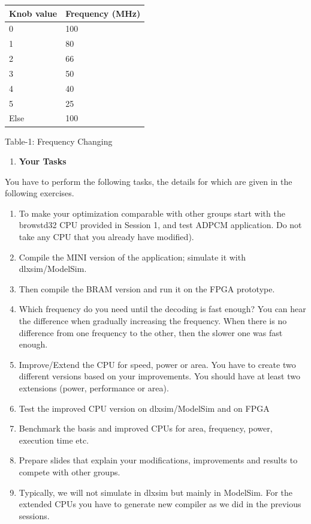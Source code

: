 \documentclass[
]{article}
\begin{document}
\begin{longtable}[]{@{}ll@{}}
\toprule
Knob value & Frequency (MHz)\tabularnewline
\midrule
\endhead
0 & 100\tabularnewline
1 & 80\tabularnewline
2 & 66\tabularnewline
3 & 50\tabularnewline
4 & 40\tabularnewline
5 & 25\tabularnewline
Else & 100\tabularnewline
\bottomrule
\end{longtable}

Table-1: Frequency Changing

\begin{enumerate}
\def\labelenumi{\arabic{enumi}.}
\setcounter{enumi}{1}
\item
  \textbf{Your Tasks}
\end{enumerate}

You have to perform the following tasks, the details for which are given
in the following exercises.

\begin{enumerate}
\def\labelenumi{\arabic{enumi}.}
\item
  To make your optimization comparable with other groups start with the
  browstd32 CPU provided in Session 1, and test ADPCM application. {Do
  not take any CPU that you already have modified}).
\item
  Compile the MINI version of the application; simulate it with
  dlxsim/ModelSim.
\item
  Then compile the BRAM version and run it on the FPGA prototype.
\item
  Which frequency do you need until the decoding is fast enough? You can
  hear the difference when gradually increasing the frequency. When
  there is no difference from one frequency to the other, then the
  slower one was fast enough.
\item
  Improve/Extend the CPU for speed, power or area. You have to create
  two different versions based on your improvements. You should have at
  least two extensions (power, performance or area).
\item
  Test the improved CPU version on dlxsim/ModelSim and on FPGA
\item
  Benchmark the basis and improved CPUs for area, frequency, power,
  execution time etc.
\item
  Prepare slides that explain your modifications, improvements and
  results to compete with other groups.
\item
  Typically, we will not simulate in dlxsim but mainly in ModelSim. For
  the extended CPUs you have to generate new compiler as we did in the
  previous sessions.
\end{enumerate}
\end{document}
